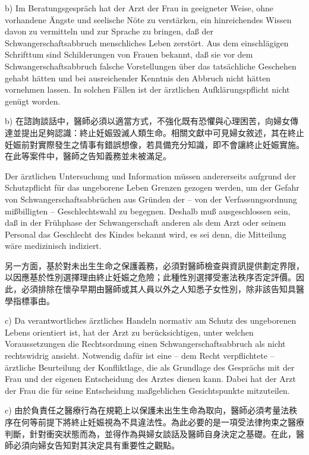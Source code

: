 \documentclass[12pt]{article}
\begin{document}
\begin{sourcepara}[title={原文D.136}]
b) Im Beratungsgespräch hat der Arzt der Frau in geeigneter Weise, ohne vorhandene Ängste und seelische Nöte zu verstärken, ein hinreichendes Wissen davon zu vermitteln und zur Sprache zu bringen, daß der Schwangerschaftsabbruch menschliches Leben zerstört. Aus dem einschlägigen Schrifttum sind Schilderungen von Frauen bekannt, daß sie vor dem Schwangerschaftsabbruch falsche Vorstellungen über das tatsächliche Geschehen gehabt hätten und bei ausreichender Kenntnis den Abbruch nicht hätten vornehmen lassen. In solchen Fällen ist der ärztlichen Aufklärungspflicht nicht genügt worden.
\end{sourcepara}
\begin{transpara}
b) 在諮詢談話中，醫師必須以適當方式，不強化既有恐懼與心理困苦，向婦女傳達並提出足夠認識：終止妊娠毀滅人類生命。相關文獻中可見婦女敘述，其在終止妊娠前對實際發生之情事有錯誤想像，若具備充分知識，即不會讓終止妊娠實施。在此等案件中，醫師之告知義務並未被滿足。
\end{transpara}

\begin{sourcepara}[title={原文D.137}]
Der ärztlichen Untersuchung und Information müssen andererseits aufgrund der Schutzpflicht für das ungeborene Leben Grenzen gezogen werden, um der Gefahr von Schwangerschaftsabbrüchen aus Gründen der -- von der Verfassungsordnung mißbilligten -- Geschlechtswahl zu begegnen. Deshalb muß ausgeschlossen sein, daß in der Frühphase der Schwangerschaft anderen als dem Arzt oder seinem Personal das Geschlecht des Kindes bekannt wird, es sei denn, die Mitteilung wäre medizinisch indiziert.
\end{sourcepara}
\begin{transpara}
另一方面，基於對未出生生命之保護義務，必須對醫師檢查與資訊提供劃定界限，以因應基於性別選擇理由終止妊娠之危險；此種性別選擇受憲法秩序否定評價。因此，必須排除在懷孕早期由醫師或其人員以外之人知悉子女性別，除非該告知具醫學指標事由。
\end{transpara}

\begin{sourcepara}[title={原文D.138}]
c) Da verantwortliches ärztliches Handeln normativ am Schutz des ungeborenen Lebens orientiert ist, hat der Arzt zu berücksichtigen, unter welchen Voraussetzungen die Rechtsordnung einen Schwangerschaftsabbruch als nicht rechtswidrig ansieht. Notwendig dafür ist eine -- dem Recht verpflichtete -- ärztliche Beurteilung der Konfliktlage, die als Grundlage des Gesprächs mit der Frau und der eigenen Entscheidung des Arztes dienen kann. Dabei hat der Arzt der Frau die für seine Entscheidung maßgeblichen Gesichtspunkte mitzuteilen.
\end{sourcepara}
\begin{transpara}
c) 由於負責任之醫療行為在規範上以保護未出生生命為取向，醫師必須考量法秩序在何等前提下將終止妊娠視為不具違法性。為此必要的是一項受法律拘束之醫療判斷，針對衝突狀態而為，並得作為與婦女談話及醫師自身決定之基礎。在此，醫師必須向婦女告知對其決定具有重要性之觀點。
\end{transpara}
\end{document}
